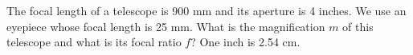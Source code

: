 The focal length of a telescope is 900 mm and its aperture is 4 inches. We use an eyepiece whose focal
length is 25 mm. What is the magnification $m$ of this telescope and what is its focal ratio $f$?
One inch is 2.54 cm.

